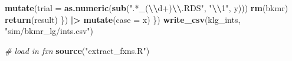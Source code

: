 \documentclass[12pt, twoside]{amherstthesis}
\newenvironment{Shaded}{\begin{snugshade}}{\end{snugshade}}
\newcommand{\AttributeTok}[1]{\textcolor[rgb]{0.13,0.29,0.53}{#1}}
\newcommand{\CommentTok}[1]{\textcolor[rgb]{0.56,0.35,0.01}{\textit{#1}}}
\newcommand{\FunctionTok}[1]{\textcolor[rgb]{0.13,0.29,0.53}{\textbf{#1}}}
\newcommand{\NormalTok}[1]{#1}
\newcommand{\SpecialCharTok}[1]{\textcolor[rgb]{0.81,0.36,0.00}{\textbf{#1}}}
\newcommand{\StringTok}[1]{\textcolor[rgb]{0.31,0.60,0.02}{#1}}
\begin{document}
\begin{Shaded}
\begin{Highlighting}[]
          \FunctionTok{mutate}\NormalTok{(}\AttributeTok{trial =} \FunctionTok{as.numeric}\NormalTok{(}\FunctionTok{sub}\NormalTok{(}\StringTok{".*\_(}\SpecialCharTok{\textbackslash{}\textbackslash{}}\StringTok{d+)}\SpecialCharTok{\textbackslash{}\textbackslash{}}\StringTok{.RDS"}\NormalTok{, }\StringTok{"}\SpecialCharTok{\textbackslash{}\textbackslash{}}\StringTok{1"}\NormalTok{, y)))}
        \FunctionTok{rm}\NormalTok{(bkmr)}
        \FunctionTok{return}\NormalTok{(result)}
\NormalTok{      \}) }\SpecialCharTok{|\textgreater{}} 
      \FunctionTok{mutate}\NormalTok{(}\AttributeTok{case =}\NormalTok{ x)}
\NormalTok{  \})}
\FunctionTok{write\_csv}\NormalTok{(klg\_ints, }\StringTok{"sim/bkmr\_lg/ints.csv"}\NormalTok{)}

\CommentTok{\# load in fxn}
\FunctionTok{source}\NormalTok{(}\StringTok{"extract\_fxns.R"}\NormalTok{)}


\end{Highlighting}
\end{Shaded}
\end{document}
